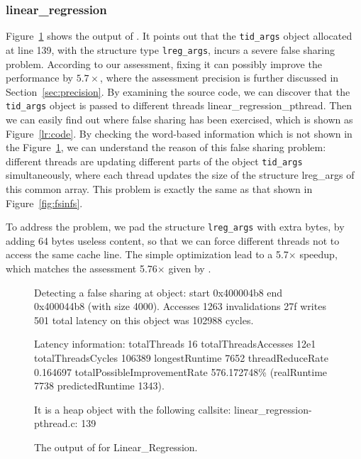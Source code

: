 
\subsubsection{linear\_regression}
Figure~\ref{fig:lr} shows the output of \cheetah{}. It points out that the {\tt tid\_args} object allocated at line 139, with the structure type {\tt lreg\_args}, incurs a severe false sharing problem. According to our assessment, fixing it can possibly improve the performance by $5.7\times$, where the assessment precision is further discussed in Section~\ref{sec:precision}. By examining the source code, we can discover that the {\tt tid\_args} object is passed to different threads linear\_regression\_pthread. Then we can easily find out where false sharing has been exercised, which is shown as Figure~\ref{lr:code}. By checking the word-based information which is not shown in the Figure~\ref{fig:lr}, we can understand the reason of this false sharing problem: different threads are updating different parts of the object {\tt tid\_args} simultaneously, where each thread updates the size of the structure lreg\_args of this common array. This problem is exactly the same as that shown in Figure~\ref{fig:fsinfs}. 

To address the problem, we pad the structure {\tt lreg\_args} with extra bytes, by adding 64 bytes useless content, so that we can force different threads not to access the same cache line. The simple optimization lead to a 5.7$\times$ speedup, which matches the assessment 5.76$\times$ given by \cheetah{}.

\begin{figure}
\begin{minipage}{\columnwidth}

\centering

\fbox
{
\begin{minipage}{3in}
Detecting a false sharing at object: start 0x400004b8 end 0x400044b8 (with size 4000).  Accesses 1263 invalidations 27f writes 501 total latency on this object was 102988 cycles.

Latency information: totalThreads 16 totalThreadsAccesses 12e1 totalThreadsCycles 106389 longestRuntime 7652 threadReduceRate 0.164697 totalPossibleImprovementRate 576.172748\% (realRuntime 7738 predictedRuntime 1343).

It is a heap object with the following callsite:
linear\_regression-pthread.c: 139
\end{minipage}
}
\vspace{1em}
\caption{The output of \cheetah{} for Linear\_Regression.}
\label{fig:lr}
\end{minipage}
\end{figure}


